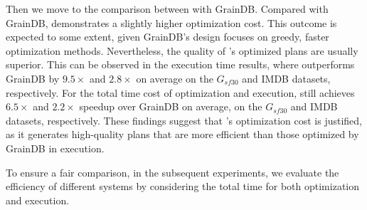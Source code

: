 Then we move to the comparison between \name with GrainDB. Compared with GrainDB, \name demonstrates a slightly higher optimization cost. This outcome is expected to some extent, given GrainDB's design focuses on greedy, faster optimization methods.
Nevertheless, the quality of \name's optimized plans are usually superior. This can be observed in the execution time results, where \name outperforms GrainDB by $9.5\times$ and $2.8\times$ on average on the $G_{sf30}$ and IMDB datasets, respectively.
For the total time cost of optimization and execution, \name still achieves $6.5\times$ and $2.2\times$ speedup over GrainDB on average, on the $G_{sf30}$ and IMDB datasets, respectively.
These findings suggest that \name's optimization cost is justified, as it generates high-quality plans that are more efficient than those optimized by GrainDB in execution.

To ensure a fair comparison, in the subsequent experiments, we evaluate the efficiency of different systems by considering the total time for both optimization and execution.


